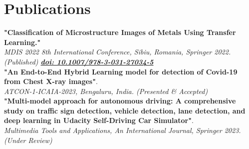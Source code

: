 \documentclass[letterpaper]{deedy-resume} %
\begin{document}
\begin{minipage}[t]{0.33\textwidth}
\sectionspace %



\vspace{-2.5mm}

\section{Publications}


\textbf{"Classification of Microstructure Images of Metals Using Transfer Learning."} \\ 
\textit{MDIS 2022 8th International Conference, Sibiu, Romania, Springer 2022. (Published) \href{https://doi.org/10.1007/978-3-031-27034-5_9}{\textbf{doi: 10.1007/978-3-031-27034-5}}}\\
\vspace{1mm}
\textbf{"An End-to-End Hybrid Learning model for detection of Covid-19 from Chest X-ray images"}. \\ 
\textit{ATCON-1-ICAIA-2023, Bengaluru, India. (Presented \& Accepted)}\\
\vspace{1mm}
\textbf{"Multi-model approach for autonomous driving: A comprehensive study on traffic sign detection, vehicle detection, lane detection, and deep learning in Udacity Self-Driving Car Simulator"}. \\
\textit{Multimedia Tools and Applications, An International Journal, Springer 2023. \\ (Under Review)}\\
    

    
\sectionspace %


\end{minipage} %
\hfill
%
%
\end{document}
